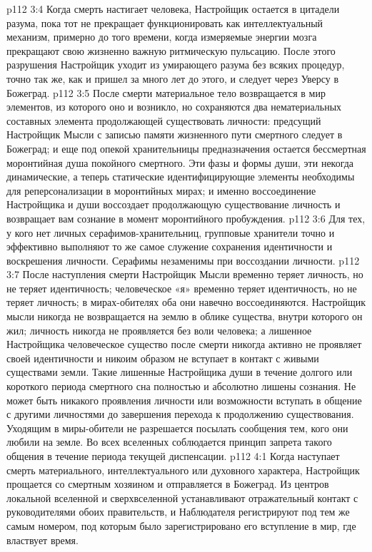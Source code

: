 \vs p112 3:4 \bibnobreakspace {} Когда смерть настигает человека, Настройщик остается в цитадели разума, пока тот не прекращает функционировать как интеллектуальный механизм, примерно до того времени, когда измеряемые энергии мозга прекращают свою жизненно важную ритмическую пульсацию. После этого разрушения Настройщик уходит из умирающего разума без всяких процедур, точно так же, как и пришел за много лет до этого, и следует через Уверсу в Божеград.
\vs p112 3:5 \pc После смерти материальное тело возвращается в мир элементов, из которого оно и возникло, но сохраняются два нематериальных составных элемента продолжающей существовать личности: предсущий Настройщик Мысли с записью памяти жизненного пути смертного следует в Божеград; и еще под опекой хранительницы предназначения остается бессмертная моронтийная душа покойного смертного. Эти фазы и формы души, эти некогда динамические, а теперь статические идентифицирующие элементы необходимы для реперсонализации в моронтийных мирах; и именно воссоединение Настройщика и души воссоздает продолжающую существование личность и возвращает вам сознание в момент моронтийного пробуждения.
\vs p112 3:6 Для тех, у кого нет личных серафимов\hyp{}хранительниц, групповые хранители точно и эффективно выполняют то же самое служение сохранения идентичности и воскрешения личности. Серафимы незаменимы при воссоздании личности.
\vs p112 3:7 После наступления смерти Настройщик Мысли временно теряет личность, но не теряет идентичность; человеческое «я» временно теряет идентичность, но не теряет личность; в мирах\hyp{}обителях оба они навечно воссоединяются. Настройщик мысли никогда не возвращается на землю в облике существа, внутри которого он жил; личность никогда не проявляется без воли человека; а лишенное Настройщика человеческое существо после смерти никогда активно не проявляет своей идентичности и никоим образом не вступает в контакт с живыми существами земли. Такие лишенные Настройщика души в течение долгого или короткого периода смертного сна полностью и абсолютно лишены сознания. Не может быть никакого проявления личности или возможности вступать в общение с другими личностями до завершения перехода к продолжению существования. Уходящим в миры\hyp{}обители не разрешается посылать сообщения тем, кого они любили на земле. Во всех вселенных соблюдается принцип запрета такого общения в течение периода текущей диспенсации.
\vs p112 4:1 Когда наступает смерть материального, интеллектуального или духовного характера, Настройщик прощается со смертным хозяином и отправляется в Божеград. Из центров локальной вселенной и сверхвселенной устанавливают отражательный контакт с руководителями обоих правительств, и Наблюдателя регистрируют под тем же самым номером, под которым было зарегистрировано его вступление в мир, где властвует время.

